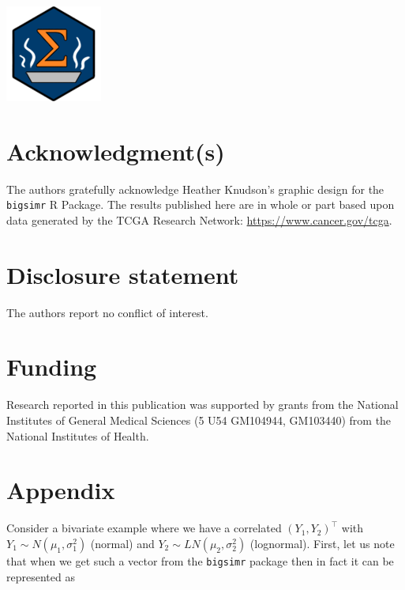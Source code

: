 \documentclass[
]{jss}
\begin{document}
\begin{CodeChunk}


\begin{center}\includegraphics[width=0.05\linewidth]{images/hex-bigsimr} \end{center}

\end{CodeChunk}

\hypertarget{acknowledgments}{%
\section*{Acknowledgment(s)}\label{acknowledgments}}

The authors gratefully acknowledge Heather Knudson's graphic design for the \texttt{bigsimr} R Package. The results published here are in whole or part based upon data generated by the TCGA Research Network: \url{https://www.cancer.gov/tcga}.

\hypertarget{coi}{%
\section*{Disclosure statement}\label{coi}}

The authors report no conflict of interest.

\hypertarget{funding}{%
\section*{Funding}\label{funding}}

Research reported in this publication was supported by grants from the National Institutes of General Medical Sciences (5 U54 GM104944, GM103440) from the National Institutes of Health.

\hypertarget{appendix}{%
\section*{Appendix}\label{appendix}}

\noindent Consider a bivariate example where we have a correlated \((Y_1, Y_2)^\top\) with \(Y_1\sim N(\mu_1, \sigma_1^2)\) (normal) and \(Y_2\sim LN(\mu_2, \sigma_2^2)\) (lognormal). First, let us note that when we get such a vector from the \texttt{bigsimr} package then in fact it can be represented as
\end{document}
